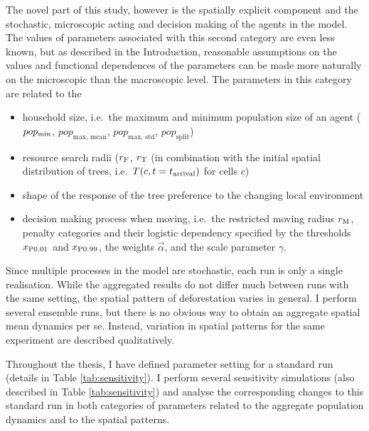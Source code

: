 The novel part of this study, however is the spatially explicit component and the stochastic, microscopic acting and decision making of the agents in the model.
The values of parameters associated with this second category are even less known, but as described in the Introduction, reasonable assumptions on the values and functional dependences of the parameters can be made more naturally on the microscopic than the macroscopic level. The parameters in this category are related to the
\begin{itemize}
	\item household size, i.e.\ the maximum and minimum population size  of an agent ($pop_{\rm min}$, $pop_\text{max, mean}$, $pop_\text{max, std}$, $pop_\text{split}$)
	\item resource search radii ($r_{\rm F}$, $r_{\rm T}$ (in combination with the initial spatial distribution of trees, i.e.\ $T(c,t=t_{\rm arrival})$ for cells $c$)
	\item shape of the response of the tree preference to the changing local environment
	\item decision making process when moving, i.e.\ the restricted moving radius $r_{\rm M}$, penalty categories and their logistic dependency specified by the thresholds $x_{\rm P0.01}$ and $x_{\rm P0.99}$, the weights $\vec{\alpha}$, and the scale parameter $\gamma$.
\end{itemize}

Since multiple processes in the model are stochastic, each run is only a single realisation. 
While the aggregated results do not differ much between runs with the same setting, the spatial pattern of deforestation varies in general. 
I perform several ensemble runs, but there is no obvious way to obtain an aggregate spatial mean dynamics per se.
Instead, variation in spatial patterns for the same experiment are described qualitatively.

Throughout the thesis, I have defined parameter setting for a standard run (details in Table \ref{tab:sensitivity}).
I perform several sensitivity simulations (also described in Table \ref{tab:sensitivity}) and analyse the corresponding changes to this standard run in both categories of parameters related to the aggregate population dynamics and to the spatial patterns.


